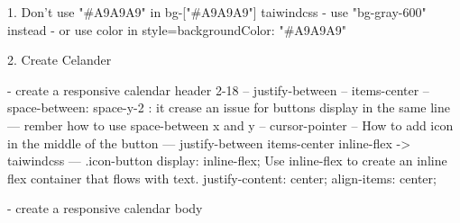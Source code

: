 1. Don't use "#A9A9A9" in bg-["#A9A9A9"] taiwindcss
- use "bg-gray-600" instead
- or use color in style={{backgroundColor: "#A9A9A9"}}


2. Create Celander

- create a responsive calendar header 2-18
-- justify-between
-- items-center
-- space-between: space-y-2 : it crease an issue for buttons display in the same line
    --- rember how to use space-between x and y
-- cursor-pointer
-- How to add icon in the middle of the button
---  justify-between items-center inline-flex -> taiwindcss
--- .icon-button {
    display: inline-flex; Use inline-flex to create an inline flex container that flows with text.
    justify-content: center; 
    align-items: center;
  }
  


- create a responsive calendar body